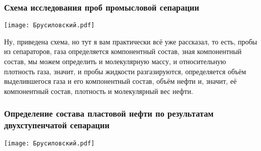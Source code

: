\documentclass[main.tex]{subfiles}
\begin{document}
\subsubsection{Схема исследования проб промысловой сепарации}

\begin{center}
\texttt{[image: Брусиловский.pdf]}
\end{center}

Ну, приведена схема, но тут я вам практически всё уже рассказал, то есть, пробы из сепараторов, газа определяется компонентный состав, зная компонентный состав, мы можем определить и молекулярную массу, и относительную плотность газа, значит, и пробы жидкости разгазируются, определяется объём выделившегося газа и его компонентный состав, объём нефти и, значит, её компонентный состав, плотность и молекулярный вес нефти.

\subsubsection{Определение состава пластовой нефти по результатам двухступенчатой сепарации}

\begin{center}
\texttt{[image: Брусиловский.pdf]}
\end{center}
\end{document}
